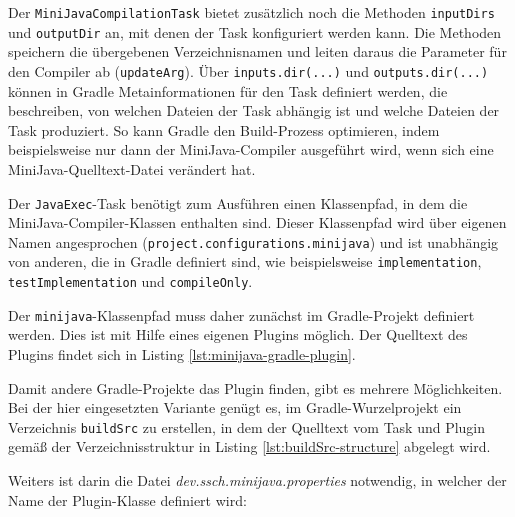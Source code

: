 

\pagebreak
Der \lstinline{MiniJavaCompilationTask} bietet zusätzlich noch die Methoden \lstinline{inputDirs} und \lstinline{outputDir} an, mit denen der Task konfiguriert werden kann. Die Methoden speichern die übergebenen Verzeichnisnamen und leiten daraus die Parameter für den Compiler ab (\lstinline{updateArg}). Über \lstinline{inputs.dir(...)} und \lstinline{outputs.dir(...)} können in Gradle Metainformationen für den Task definiert werden, die beschreiben, von welchen Dateien der Task abhängig ist und welche Dateien der Task produziert. So kann Gradle den Build-Prozess optimieren, indem beispielsweise nur dann der MiniJava-Compiler ausgeführt wird, wenn sich eine MiniJava-Quelltext-Datei verändert hat.

Der \lstinline{JavaExec}-Task benötigt zum Ausführen einen Klassenpfad, in dem die MiniJava-Compiler-Klassen enthalten sind. Dieser Klassenpfad wird über eigenen Namen angesprochen (\lstinline{project.configurations.minijava}) und ist unabhängig von anderen, die in Gradle definiert sind, wie beispielsweise \lstinline{implementation}, \lstinline{testImplementation} und \lstinline{compileOnly}.

Der \lstinline{minijava}-Klassenpfad muss daher zunächst im Gradle-Projekt definiert werden. Dies ist mit Hilfe eines eigenen Plugins möglich. Der Quelltext des Plugins findet sich in Listing \ref{lst:minijava-gradle-plugin}.



Damit andere Gradle-Projekte das Plugin finden, gibt es mehrere Möglichkeiten. Bei der hier eingesetzten Variante genügt es, im Gradle-Wurzelprojekt ein Verzeichnis \lstinline{buildSrc} zu erstellen, in dem der Quelltext vom Task und Plugin gemäß der Verzeichnisstruktur in Listing \ref{lst:buildSrc-structure} abgelegt wird.



Weiters ist darin die Datei \emph{dev.ssch.minijava.properties} notwendig, in welcher der Name der Plugin-Klasse definiert wird:



